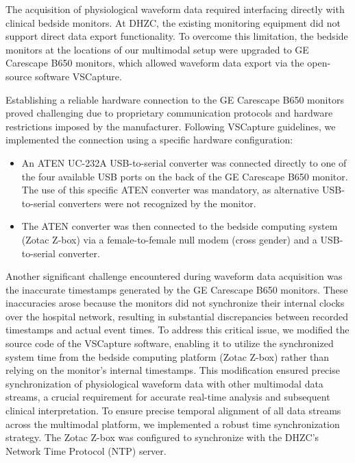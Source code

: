 The acquisition of physiological waveform data required interfacing directly with clinical bedside monitors. At DHZC, the existing monitoring equipment did not support direct data export functionality. To overcome this limitation, the bedside monitors at the locations of our multimodal setup were upgraded to GE Carescape B650 monitors, which allowed waveform data export via the open-source software VSCapture.

Establishing a reliable hardware connection to the GE Carescape B650 monitors proved challenging due to proprietary communication protocols and hardware restrictions imposed by the manufacturer. Following VSCapture guidelines, we implemented the connection using a specific hardware configuration:

\begin{itemize}
  \item An ATEN UC-232A USB-to-serial converter was connected directly to one of the four available USB ports on the back of the GE Carescape B650 monitor. The use of this specific ATEN converter was mandatory, as alternative USB-to-serial converters were not recognized by the monitor.
  \item The ATEN converter was then connected to the bedside computing system (Zotac Z-box) via a female-to-female null modem (cross gender) and a USB-to-serial converter.
\end{itemize}

Another significant challenge encountered during waveform data acquisition was the inaccurate timestamps generated by the GE Carescape B650 monitors. These inaccuracies arose because the monitors did not synchronize their internal clocks over the hospital network, resulting in substantial discrepancies between recorded timestamps and actual event times. To address this critical issue, we modified the source code of the VSCapture software, enabling it to utilize the synchronized system time from the bedside computing platform (Zotac Z-box) rather than relying on the monitor's internal timestamps. This modification ensured precise synchronization of physiological waveform data with other multimodal data streams, a crucial requirement for accurate real-time analysis and subsequent clinical interpretation. To ensure precise temporal alignment of all data streams across the multimodal platform, we implemented a robust time synchronization strategy. The Zotac Z-box was configured to synchronize with the DHZC's Network Time Protocol (NTP) server.

